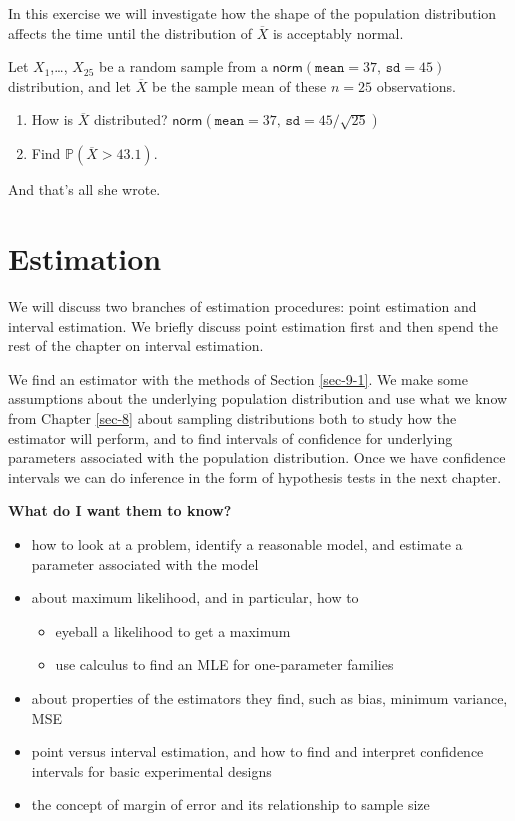 \documentclass[captions=tableheading]{scrbook}
\begin{document}
\begin{xca}
In this exercise we will investigate how the shape of the population distribution affects the time until the distribution of \(\overline{X}\) is acceptably normal.
\end{xca}

\begin{xca}
Let \(X_{1}\),\ldots{}, \(X_{25}\) be a random sample from a \(\mathsf{norm}(\mathtt{mean}=37,\,\mathtt{sd}=45)\) distribution, and let \(\overline{X}\) be the sample mean of these \(n=25\) observations.
\begin{enumerate}
\item How is \(\overline{X}\) distributed? 
   \(\mathsf{norm}(\mathtt{mean}=37,\,\mathtt{sd}=45/\sqrt{25})\)
\item Find \(\mathbb{P}(\overline{X} > 43.1)\).
\end{enumerate}
And that's all she wrote.
\end{xca}
\chapter{Estimation}
\label{sec-9}
\label{cha-Estimation}


\noindent 
We will discuss two branches of estimation procedures: point estimation and interval estimation. We briefly discuss point estimation first and then spend the rest of the chapter on interval estimation.

We find an estimator with the methods of Section \ref{sec-9-1}. We make some assumptions about the underlying population distribution and use what we know from Chapter \ref{sec-8} about sampling distributions both to study how the estimator will perform, and to find intervals of confidence for underlying parameters associated with the population distribution. Once we have confidence intervals we can do inference in the form of hypothesis tests in the next chapter.

\textbf{What do I want them to know?}
\begin{itemize}
\item how to look at a problem, identify a reasonable model, and estimate a parameter associated with the model
\item about maximum likelihood, and in particular, how to
\begin{itemize}
\item eyeball a likelihood to get a maximum
\item use calculus to find an MLE for one-parameter families
\end{itemize}
\item about properties of the estimators they find, such as bias, minimum variance, MSE
\item point versus interval estimation, and how to find and interpret confidence intervals for basic experimental designs
\item the concept of margin of error and its relationship to sample size
\end{itemize}
\end{document}
